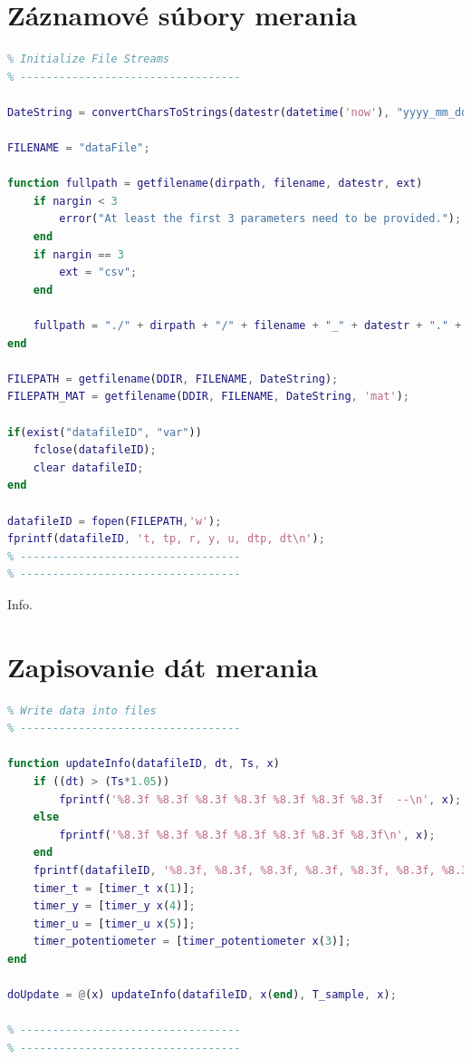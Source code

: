 \documentclass[a4paper, 10pt, ]{article}
\begin{document}
\section{Záznamové súbory merania}
\begin{lstlisting}[caption=Inicializácia záznamových súborov., label={code:files}, language=Matlab]
% ----------------------------------
% Initialize File Streams
% ----------------------------------

DateString = convertCharsToStrings(datestr(datetime('now'), "yyyy_mm_dd_HH_MM_ss"));

FILENAME = "dataFile";

function fullpath = getfilename(dirpath, filename, datestr, ext)
    if nargin < 3
        error("At least the first 3 parameters need to be provided.");
    end
    if nargin == 3
        ext = "csv";
    end

    fullpath = "./" + dirpath + "/" + filename + "_" + datestr + "." + ext;
end

FILEPATH = getfilename(DDIR, FILENAME, DateString);
FILEPATH_MAT = getfilename(DDIR, FILENAME, DateString, 'mat');

if(exist("datafileID", "var"))
    fclose(datafileID);
    clear datafileID;
end

datafileID = fopen(FILEPATH,'w');
fprintf(datafileID, 't, tp, r, y, u, dtp, dt\n');
% ----------------------------------
% ----------------------------------
\end{lstlisting}

Info.

\section{Zapisovanie dát merania}
\begin{lstlisting}[caption=Zapisovanie meraných dát do súboru a konzoly., label={code:files_write}, language=Matlab]
% ----------------------------------
% Write data into files
% ----------------------------------

function updateInfo(datafileID, dt, Ts, x)
    if ((dt) > (Ts*1.05))
        fprintf('%8.3f %8.3f %8.3f %8.3f %8.3f %8.3f %8.3f  --\n', x);
    else
        fprintf('%8.3f %8.3f %8.3f %8.3f %8.3f %8.3f %8.3f\n', x);
    end
    fprintf(datafileID, '%8.3f, %8.3f, %8.3f, %8.3f, %8.3f, %8.3f, %8.3f\n', x);
    timer_t = [timer_t x(1)];
    timer_y = [timer_y x(4)];
    timer_u = [timer_u x(5)];
    timer_potentiometer = [timer_potentiometer x(3)];
end

doUpdate = @(x) updateInfo(datafileID, x(end), T_sample, x);

% ----------------------------------
% ----------------------------------
\end{lstlisting}
\end{document}

